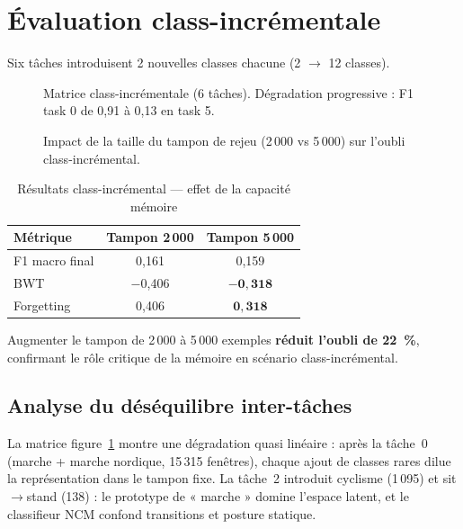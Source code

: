\section{Évaluation class-incrémentale}

Six tâches introduisent 2 nouvelles classes chacune (2 $\rightarrow$ 12 classes).

\begin{figure}[H]
  \centering
  \caption[Matrice class-incrémental]{Matrice class-incrémentale (6 tâches).
  Dégradation progressive : F1 task 0 de 0,91 à 0,13 en task 5.}
  \label{fig:matrix_class}
\end{figure}

\begin{figure}[H]
  \centering
  \caption[Impact taille du tampon]{Impact de la taille du tampon de rejeu
  (2\,000 vs 5\,000) sur l'oubli class-incrémental.}
  \label{fig:class_buffer}
\end{figure}

\begin{table}[H]
\centering
\small
\begin{tabularx}{0.85\textwidth}{|Y|c|c|}
\hline
\textbf{Métrique} & \textbf{Tampon 2\,000} & \textbf{Tampon 5\,000} \\
\hline
F1 macro final    & 0,161 & 0,159 \\
BWT               & $-$0,406 & $\mathbf{-0,318}$ \\
Forgetting        & 0,406 & $\mathbf{0,318}$ \\
\hline
\end{tabularx}
\caption{Résultats class-incrémental — effet de la capacité mémoire}
\label{tab:class_incremental}
\end{table}

Augmenter le tampon de 2\,000 à 5\,000 exemples \textbf{réduit l'oubli de 22~\%},
confirmant le rôle critique de la mémoire en scénario class-incrémental.

\subsection{Analyse du déséquilibre inter-tâches}

La matrice figure~\ref{fig:matrix_class} montre une dégradation quasi linéaire :
après la tâche~0 (marche + marche nordique, 15\,315 fenêtres), chaque ajout de
classes rares dilue la représentation dans le tampon fixe. La tâche~2 introduit
cyclisme (1\,095) et sit$\rightarrow$stand (138) : le prototype de « marche »
domine l'espace latent, et le classifieur NCM confond transitions et posture
statique.

